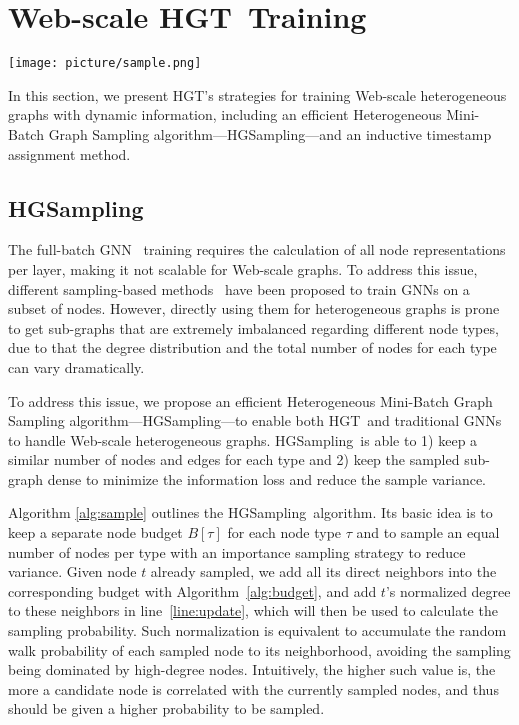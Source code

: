 \documentclass[sigconf]{acmart}
\theoremstyle{definition}
\newcommand{\short}{HGT}
\newcommand{\sampling}{HGSampling}
\begin{document}
%
 
\section{Web-scale \short\ Training}\label{sec:train}


 \begin{figure*}[ht!]
    \centering
    \texttt{[image: picture/sample.png]}
    \caption{\sampling\ with Inductive Timestamp Assignment.}
    \label{fig:sample}
\end{figure*} 


In this section, we present \short's strategies for training Web-scale heterogeneous graphs with dynamic information, including an efficient Heterogeneous Mini-Batch Graph Sampling algorithm---\sampling---and an inductive timestamp assignment method. 

\subsection{\sampling}

The full-batch GNN~\cite{gcn} training requires the calculation of all node representations per layer, 
making it not scalable for Web-scale graphs. 
To address this issue, different sampling-based methods~\cite{graphsage,fastgcn,DBLP:conf/icml/ChenZS18,ladies} have been proposed to train GNNs on a subset of nodes. 
However, directly using them for heterogeneous graphs is prone to get sub-graphs that are extremely imbalanced regarding different node types, due to that the degree distribution and the total number of nodes for each type can vary dramatically. 

To address this issue, we propose an efficient Heterogeneous Mini-Batch Graph Sampling algorithm---\sampling---to enable both \short\ and traditional GNNs to handle Web-scale heterogeneous graphs. 
\sampling\ is able to 1) keep a similar number of nodes and edges for each type and 2) keep the sampled sub-graph dense to minimize the information loss and reduce the sample variance. 


Algorithm \ref{alg:sample} outlines the \sampling\ algorithm. 
Its basic idea is to keep a separate node budget $B[\tau]$ for each node type $\tau$ and to sample an equal number of nodes per type with an importance sampling strategy to reduce variance. 
Given node $t$ already sampled, we add all its direct neighbors into the corresponding budget with Algorithm~\ref{alg:budget}, and add $t$'s normalized degree to these neighbors in line~\ref{line:update}, which will then be used to calculate the sampling probability. 
Such normalization is equivalent to accumulate the random walk probability of each sampled node to its neighborhood, avoiding the sampling being dominated by high-degree nodes. 
Intuitively, the higher such value is, the more a candidate node is correlated with the currently sampled nodes, and thus should be given a higher probability to be sampled.
\end{document}
